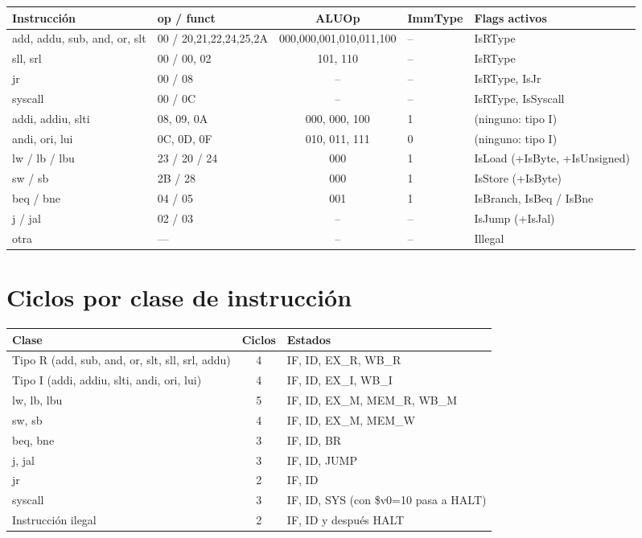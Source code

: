 \documentclass[10pt,a4paper]{article}
\begin{document}
\begin{center}\footnotesize\setlength{\tabcolsep}{4pt}
\begin{tabular}{@{}llcll@{}}
\toprule
Instrucción & op / funct & ALUOp & ImmType & Flags activos \\
\midrule
add, addu, sub, and, or, slt & 00 / 20,21,22,24,25,2A & 000,000,001,010,011,100 & -- & IsRType \\
sll, srl & 00 / 00, 02 & 101, 110 & -- & IsRType \\
jr & 00 / 08 & -- & -- & IsRType, IsJr \\
syscall & 00 / 0C & -- & -- & IsRType, IsSyscall \\
addi, addiu, slti & 08, 09, 0A & 000, 000, 100 & 1 & (ninguno: tipo I) \\
andi, ori, lui & 0C, 0D, 0F & 010, 011, 111 & 0 & (ninguno: tipo I) \\
lw / lb / lbu & 23 / 20 / 24 & 000 & 1 & IsLoad (+IsByte, +IsUnsigned) \\
sw / sb & 2B / 28 & 000 & 1 & IsStore (+IsByte) \\
beq / bne & 04 / 05 & 001 & 1 & IsBranch, IsBeq / IsBne \\
j / jal & 02 / 03 & -- & -- & IsJump (+IsJal) \\
otra & --- & -- & -- & Illegal \\
\bottomrule
\end{tabular}
\end{center}

\section{Ciclos por clase de instrucción}

\begin{center}\small
\begin{tabular}{@{}lcl@{}}
\toprule
Clase & Ciclos & Estados \\
\midrule
Tipo R (add, sub, and, or, slt, sll, srl, addu) & 4 & IF, ID, EX\_R, WB\_R \\
Tipo I (addi, addiu, slti, andi, ori, lui) & 4 & IF, ID, EX\_I, WB\_I \\
lw, lb, lbu & 5 & IF, ID, EX\_M, MEM\_R, WB\_M \\
sw, sb & 4 & IF, ID, EX\_M, MEM\_W \\
beq, bne & 3 & IF, ID, BR \\
j, jal & 3 & IF, ID, JUMP \\
jr & 2 & IF, ID \\
syscall & 3 & IF, ID, SYS (con \$v0=10 pasa a HALT) \\
Instrucción ilegal & 2 & IF, ID y después HALT \\
\bottomrule
\end{tabular}
\end{center}
\end{document}

